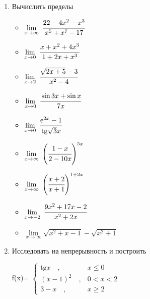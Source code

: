 \documentclass{article}
\begin{document}
\begin{multicols}{2}
	\begin{enumerate}[label=\arabic*.]
		\item Вычислить пределы
		\begin{multicols}{3}
			\begin{itemize}[label="", leftmargin=-3mm]
				\item $\lim\limits_{x \to \infty}\ \cfrac{22-4x^2-x^3}{x^5+x^7-17}$
				\item $\lim\limits_{x \to 0}\ \cfrac{x+x^2+4x^3}{1+2x+x^3}$
				\item $\lim\limits_{x \to 2}\ \cfrac{\sqrt{2x+5}-3}{x^2-4}$
				\vfill\null\columnbreak
				\item $\lim\limits_{x \to 0}\ \cfrac{\sin 3x + \sin x}{7x}$
				\item $\lim\limits_{x \to 0}\ \cfrac{\mbox{e}^{2x}-1}{\mbox{tg}\sqrt{3}x}$
				\item $\lim\limits_{x \to \infty}\ \Bigg(\cfrac{1-x}{2-10x}\Bigg)^{5x}$
				\vfill\null\columnbreak
				\item $\lim\limits_{x \to \infty}\ \Bigg(\cfrac{x+2}{x+1}\Bigg)^{1+2x}$
				\item $\lim\limits_{x \to -2}\ \cfrac{9x^2+17x-2}{x^2+2x}$
				\item $\lim\limits_{x \to \infty} \sqrt{x^2+x-1}-\sqrt{x^2+1}$
				\vfill\null\columnbreak
			\end{itemize}
		\end{multicols}
		\vspace{-6mm}
		\item Исследовать на непрерывность и построить
		\begin{multicols}{3}
			f(x)=
			$\begin{cases}
			\mbox{tg}x \quad, & x \leq 0\\
			(x-1)^2 \quad, & 0< x < 2 \\
			3-x \quad, & x \geq 2
			\end{cases}$
			\vfill\null\columnbreak
			\vfill\null\columnbreak
		\end{multicols}
		

\end{enumerate}
\end{multicols}
\end{document}
